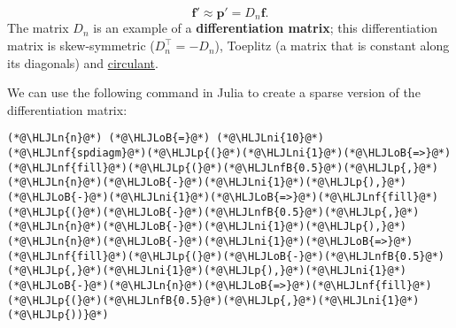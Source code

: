 \documentclass[12pt,a4paper]{article}
\newcommand{\HLJLn}[1]{#1}
\newcommand{\HLJLnf}[1]{\textcolor[RGB]{66,102,213}{#1}}
\newcommand{\HLJLnfB}[1]{\textcolor[RGB]{59,151,46}{#1}}
\newcommand{\HLJLni}[1]{\textcolor[RGB]{59,151,46}{#1}}
\newcommand{\HLJLoB}[1]{\textcolor[RGB]{102,102,102}{\textbf{#1}}}
\newcommand{\HLJLp}[1]{#1}
\begin{document}
\[
\mathbf{f}' \approx \mathbf{p}' = D_n\mathbf{f}.
\]
The matrix $D_n$ is an example of a \textbf{differentiation matrix}; this differentiation matrix is skew-symmetric ($D_n^{\top} = -D_n$), Toeplitz (a matrix that is constant along its diagonals) and \href{https://en.wikipedia.org/wiki/Circulant_matrix}{circulant}.  

We can use the following command in Julia to create a sparse version of the differentiation matrix:


\begin{lstlisting}
(*@\HLJLn{n}@*) (*@\HLJLoB{=}@*) (*@\HLJLni{10}@*)
(*@\HLJLnf{spdiagm}@*)(*@\HLJLp{(}@*)(*@\HLJLni{1}@*)(*@\HLJLoB{=>}@*)(*@\HLJLnf{fill}@*)(*@\HLJLp{(}@*)(*@\HLJLnfB{0.5}@*)(*@\HLJLp{,}@*)(*@\HLJLn{n}@*)(*@\HLJLoB{-}@*)(*@\HLJLni{1}@*)(*@\HLJLp{),}@*)(*@\HLJLoB{-}@*)(*@\HLJLni{1}@*)(*@\HLJLoB{=>}@*)(*@\HLJLnf{fill}@*)(*@\HLJLp{(}@*)(*@\HLJLoB{-}@*)(*@\HLJLnfB{0.5}@*)(*@\HLJLp{,}@*)(*@\HLJLn{n}@*)(*@\HLJLoB{-}@*)(*@\HLJLni{1}@*)(*@\HLJLp{),}@*)(*@\HLJLn{n}@*)(*@\HLJLoB{-}@*)(*@\HLJLni{1}@*)(*@\HLJLoB{=>}@*)(*@\HLJLnf{fill}@*)(*@\HLJLp{(}@*)(*@\HLJLoB{-}@*)(*@\HLJLnfB{0.5}@*)(*@\HLJLp{,}@*)(*@\HLJLni{1}@*)(*@\HLJLp{),}@*)(*@\HLJLni{1}@*)(*@\HLJLoB{-}@*)(*@\HLJLn{n}@*)(*@\HLJLoB{=>}@*)(*@\HLJLnf{fill}@*)(*@\HLJLp{(}@*)(*@\HLJLnfB{0.5}@*)(*@\HLJLp{,}@*)(*@\HLJLni{1}@*)(*@\HLJLp{))}@*)
\end{lstlisting}
\end{document}

